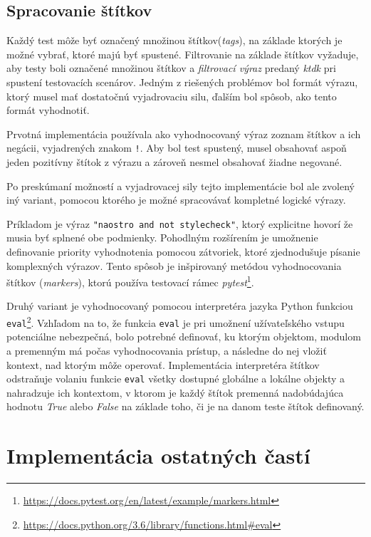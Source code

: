 \documentclass[
  digital, %
  oneside, %
  table,   %
  lof,     %
  lot,   %
]{fithesis3}
\newcommand*{\footurl}[1]{\footnote{\url{#1}}}
\begin{document}
\subsection{Spracovanie štítkov}

Každý test môže byť označený množinou štítkov(\emph{tags}), na základe ktorých je možné vybrať, ktoré majú byť spustené. Filtrovanie na základe štítkov vyžaduje, aby testy boli označené množinou štítkov a \emph{filtrovací výraz} predaný \emph{ktdk} pri spustení testovacích scenárov. Jedným z riešených problémov bol formát výrazu, ktorý musel mať dostatočnú vyjadrovaciu silu, ďalším bol spôsob, ako tento formát vyhodnotiť. 

Prvotná implementácia používala ako vyhodnocovaný výraz zoznam štítkov a ich negácii, vyjadrených znakom \texttt{!}. Aby bol test spustený, musel obsahovať aspoň jeden pozitívny štítok z výrazu a zároveň nesmel obsahovať žiadne negované.

Po preskúmaní možností a vyjadrovacej sily tejto implementácie bol ale zvolený iný variant, pomocou ktorého je možné spracovávať kompletné logické výrazy.

Príkladom je výraz \texttt{"naostro and not stylecheck"}, ktorý explicitne hovorí že musia byť splnené obe podmienky. Pohodlným rozšírením je umožnenie definovanie priority vyhodnotenia pomocou zátvoriek, ktoré zjednodušuje písanie komplexných výrazov. Tento spôsob je inšpirovaný metódou vyhodnocovania štítkov (\emph{markers}), ktorú používa testovací rámec \emph{pytest}\footurl{https://docs.pytest.org/en/latest/example/markers.html}.

Druhý variant je vyhodnocovaný pomocou interpretéra jazyka Python funkciou \texttt{eval}\footurl{https://docs.python.org/3.6/library/functions.html\#eval}. Vzhľadom na to, že funkcia \texttt{eval} je pri umožnení užívateľského vstupu potenciálne nebezpečná, bolo potrebné definovať, ku ktorým objektom, modulom a premenným má počas vyhodnocovania prístup, a následne do nej vložiť kontext, nad ktorým môže operovať. Implementácia interpretéra štítkov odstraňuje volaniu funkcie \texttt{eval} všetky dostupné globálne a lokálne objekty a nahradzuje ich kontextom, v ktorom je každý štítok premenná nadobúdajúca hodnotu \emph{True} alebo \emph{False} na základe toho, či je na danom teste štítok definovaný. 

\section{Implementácia ostatných častí}
\end{document}
